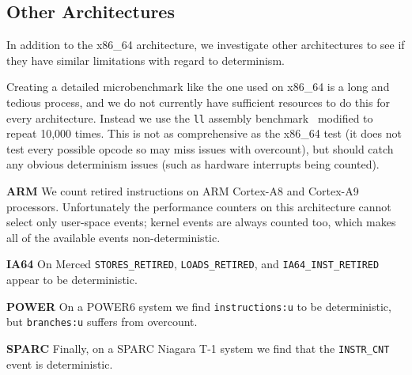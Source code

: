 \subsection{Other Architectures}

In addition to the x86\_64 architecture, we investigate other 
architectures to see 
if they have similar limitations with regard to determinism.

Creating a detailed microbenchmark like the one used on x86\_64
is a long and tedious process, and
we do not currently have sufficient resources to 
do this for every architecture.  
Instead we use the {\tt ll} assembly benchmark~\cite{weaver+:iccd09}
modified to repeat 10,000 times.  
This is not as comprehensive 
as the x86\_64 test (it does not test every possible opcode so 
may miss issues with overcount), 
but should catch any obvious determinism issues (such
as hardware interrupts being counted).

{\bf ARM}
We count retired instructions on ARM Cortex-A8 and Cortex-A9 processors.  
Unfortunately the performance counters on this architecture
cannot select only user-space events; kernel events are always counted too, 
which makes all of the available events non-deterministic.

{\bf IA64}
On Merced {\tt STORES\_RETIRED}, {\tt LOADS\_RETIRED}, and 
{\tt IA64\_INST\_RETIRED} appear to be deterministic.

{\bf POWER}
On a POWER6 system we find {\tt instructions:u} to be 
deterministic, but {\tt branches:u} suffers from
overcount.

{\bf SPARC}
Finally, on a SPARC Niagara T-1 system we find that the {\tt INSTR\_CNT} 
event is deterministic.
